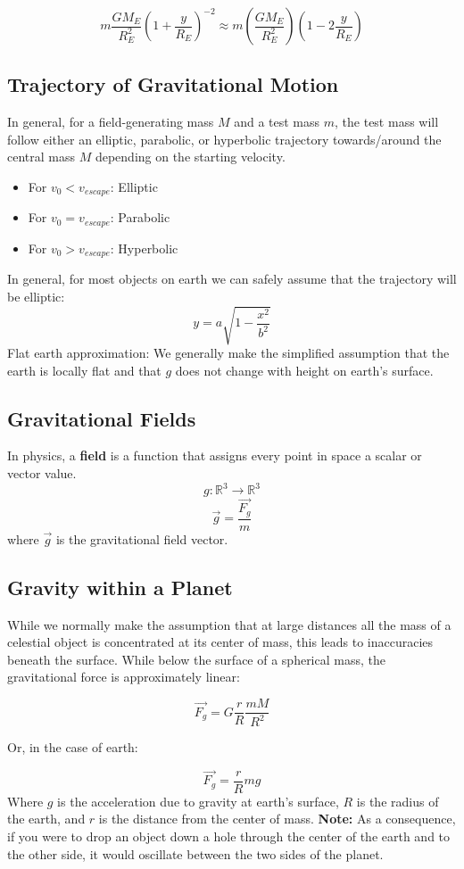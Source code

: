 \documentclass{article}
\begin{document}
$$m\frac{GM_E}{R^2_E}\left(1+\frac{y}{R_E}\right)^{-2}\approx m\left(\frac{GM_E}{R^2_E}\right)\left(1-2\frac{y}{R_E}\right)$$
\subsection{Trajectory of Gravitational Motion}
In general, for a field-generating mass $M$ and a test mass $m$, the test mass will follow either an elliptic, parabolic, or hyperbolic trajectory towards/around the central mass $M$ depending on the starting velocity.

\begin{itemize}
    \item For $v_0<v_{escape}$: Elliptic 
    \item For $v_0=v_{escape}$: Parabolic
    \item For $v_0>v_{escape}$: Hyperbolic
\end{itemize}
In general, for most objects on earth we can safely assume that the trajectory will be elliptic:
$$y=a\sqrt{1-\frac{x^2}{b^2}}$$
Flat earth approximation: We generally make the simplified assumption that the earth is locally flat and that $g$ does not change with height on earth's surface.
\subsection{Gravitational Fields}
In physics, a \textbf{field} is a function that assigns every point in space a scalar or vector value.
$$g:\mathbb{R}^3 \rightarrow \mathbb{R}^3$$
$$\vec{g}=\frac{\vec{F_g}}{m}$$
where $\vec{g}$ is the gravitational field vector.

\subsection{Gravity within a Planet} While we normally make the assumption that at large distances all the mass of a celestial object is concentrated at its center of mass, this leads to inaccuracies beneath the surface. While below the surface of a spherical mass, the gravitational force is approximately linear:

$$\vec{F_g}=G\frac{r}{R}\frac{mM}{R^2}$$

Or, in the case of earth:

$$\vec{F_g}=\frac{r}{R}mg$$
Where $g$ is the acceleration due to gravity at earth's surface, $R$ is the radius of the earth, and $r$ is the distance from the center of mass. \textbf{Note:} As a consequence, if you were to drop an object down a hole through the center of the earth and to the other side, it would oscillate between the two sides of the planet.
\end{document}
